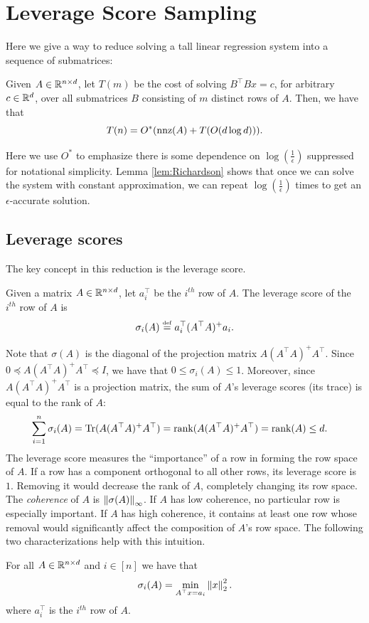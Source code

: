 
\section{Leverage Score Sampling\label{sec:Leverage-Score-Sampling}}

Here we give a way to reduce solving a tall linear regression system
into a sequence of submatrices:
\begin{thm}
Given $A\in\mathbb{R}^{n\times d}$, let $T(m)$ be the cost of solving $B^{\top}Bx=c$,
for arbitrary $c\in\mathbb{R}^{d}$, over all submatrices $B$ consisting
of $m$ distinct rows of $A$. Then, we have that
\[
T(n)=O^{*}(\mathrm{nnz}(A)+T(O(d\log d))).
\]
\end{thm}

\begin{rem*}
Here we use $O^{*}$ to emphasize there is some dependence on $\log(\frac{1}{\epsilon})$
suppressed for notational simplicity. Lemma \ref{lem:Richardson}
shows that once we can solve the system with constant approximation,
we can repeat $\log(\frac{1}{\epsilon})$ times to get an $\epsilon$-accurate
solution.
\end{rem*}

\subsection{Leverage scores}

The key concept in this reduction is the leverage score.
\begin{defn}
Given a matrix $A\in\mathbb{R}^{n\times d}$, let $a^{\top}_{i}$ be the $i^{th}$
row of $A$. The leverage score of the $i^{th}$ row of $A$ is
\[
\sigma_{i}(A)\stackrel{\mathrm{{\scriptscriptstyle def}}}{=} a^{\top}_{i}(A^{\top}A)^{+}a_{i}.
\]
\end{defn}

Note that $\sigma(A)$ is the diagonal of the projection matrix $A(A^{\top}A)^{+}A^{\top}$.
Since $0\preceq A(A^{\top}A)^{+}A^{\top}\preceq I$, we have that
$0\leq\sigma_{i}(A)\leq1$. Moreover, since $A(A^{\top}A)^{+}A^{\top}$
is a projection matrix, the sum of $A$'s leverage scores (its trace)
is equal to the rank of $A$: 
\begin{align}
\sum^{n}_{i=1}\sigma_{i}(A)=\mathrm{Tr}(A(A^{\top}A)^{+}A^{\top}) & =\text{rank}(A(A^{\top}A)^{+}A^{\top})=\text{rank}(A)\le d.\label{rank_bound}
\end{align}
The leverage score measures the ``importance'' of a row in forming
the row space of $A$. If a row has a component orthogonal to all
other rows, its leverage score is $1$. Removing it would decrease
the rank of $A$, completely changing its row space. The \emph{coherence}
of $A$ is $\left\Vert \sigma(A)\right\Vert_{\infty}$. If $A$ has low coherence,
no particular row is especially important. If $A$ has high coherence,
it contains at least one row whose removal would significantly affect
the composition of $A$'s row space. The following two characterizations
help with this intuition. 
\begin{lem}
\label{leverage_score_opt} For all $A\in\mathbb{R}^{n\times d}$ and $i\in[n]$
we have that
\[
\sigma_{i}(A)=\min_{A^{\top}x=a_{i}}\left\Vert x\right\Vert^{2}_{2}.
\]
where $a^{\top}_{i}$ is the $i^{th}$ row of $A$. 
\end{lem}


